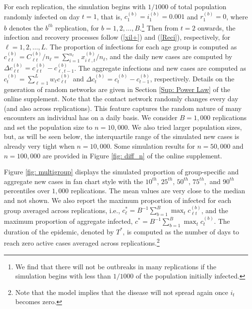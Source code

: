 \documentclass[12pt]{article}
\begin{document}
For each replication, the simulation begins with $1/1000$ of total population
randomly infected on day $t=1$, that is, $c_{1}^{\left(  b\right)  }%
=i_{1}^{\left(  b\right)  }=0.001$ and $r_{1}^{\left(  b\right)  }=0$, where
$b$ denotes the $b^{th}$ replication, for $b=1,2,\ldots,B$.\footnote{We find
that there will not be outbreaks in many replications if the simulation begins
with less than $1/1000$ of the population initially infected.} Then from $t=2$
onwards, the infection and recovery processes follow (\ref{xil+}) and
(\ref{Reci}), respectively, for $\ell=1,2,\ldots,L.$ The proportion of
infections for each age group is computed as $c_{\ell t}^{\left(  b\right)
}=C_{\ell t}^{\left(  b\right)  }/n_{\ell}=\sum_{i=1}^{n_{\ell}}x_{i\ell
,t}^{\left(  b\right)  }/n_{\ell}$, and the daily new cases are computed by
$\Delta c_{\ell t}^{\left(  b\right)  }=c_{\ell t}^{\left(  b\right)
}-c_{\ell,t-1}^{\left(  b\right)  }$. The aggregate infections and new cases
are computed as $c_{t}^{\left(  b\right)  }=\sum_{\ell=1}^{L}w_{\ell}c_{\ell
t}^{\left(  b\right)  }$ and $\Delta c_{t}^{\left(  b\right)  }=c_{t}^{\left(
b\right)  }-c_{t-1}^{\left(  b\right)  }$, respectively. Details on the
generation of random networks are given in Section \ref{Sup: Power Law} of the
online supplement. Note that the contact network randomly changes every day
(and also across replications). This feature captures the random nature of
many encounters an individual has on a daily basis. We consider $B=1,000$
replications and set the population size to $n=10,000$. We also tried larger
population sizes, but, as will be seen below, the interquartile range of the
simulated new cases is already very tight when $n=10,000$. Some simulation
results for $n=50,000$ and $n=100,000$ are provided in Figure
\ref{fig: diff_n} of the online supplement.

Figure \ref{fig: multigroup} displays the simulated proportion of
group-specific and aggregate new cases in fan chart style with the $10^{th}$,
$25^{th}$, $50^{th}$, $75^{th},$ and $90^{th}$ percentiles over $1,000$
replications. The mean values are very close to the median and not shown. We
also report the maximum proportion of infected for each group averaged across
replications, i.e., $c_{\ell}^{\ast}=B^{-1}\sum_{b=1}^{B}\max_{t}c_{\ell
t}^{(b)}$, and the maximum proportion of aggregate infected, $c^{\ast}%
=B^{-1}\sum_{b=1}^{B}\max_{t}c_{t}^{(b)}$. The duration of the epidemic,
denoted by $T^{\ast}$, is computed as the number of days to reach zero active
cases averaged across replications.\footnote{Note that the model implies that
the disease will not spread again once $i_{t}$ becomes zero.}
\end{document}
